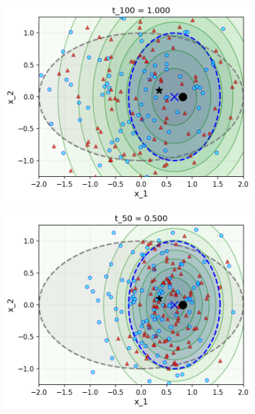 \documentclass[../../book-main.tex]{subfiles}
\begin{document}
\begin{example}
  \begin{figure}[tbp]
    \centering
    \begin{subfigure}{0.32\textwidth}
      \includegraphics[width=\linewidth]{figs_chap5/samples_step_000_t_100_largenoise.png}
    \end{subfigure}
    \hfill
    \begin{subfigure}{0.32\textwidth}
      \includegraphics[width=\linewidth]{figs_chap5/samples_step_050_t_50_largenoise.png}
    \end{subfigure}

\end{figure}
\end{example}
\end{document}

